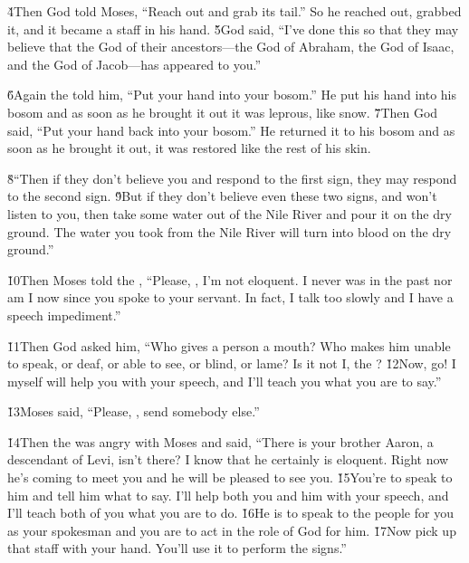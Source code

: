 \v{4}Then God told Moses, ``Reach out and grab its tail.'' So he reached out, grabbed it, and it became a staff in his hand. \v{5}God said, ``I've done this so that they may believe that the  God of their ancestors---the God of Abraham, the God of Isaac, and the God of Jacob---has appeared to you.''

\v{6}Again the  told him, ``Put your hand into your bosom.'' He put his hand into his bosom and as soon as he brought it out it was leprous, like snow. \v{7}Then God said, ``Put your hand back into your bosom.'' He returned it to his bosom and as soon as he brought it out, it was restored like the rest of his skin.

\v{8}``Then if they don't believe you and respond to the first sign, they may respond to the second sign. \v{9}But if they don't believe even these two signs, and won't listen to you, then take some water out of the Nile River and pour it on the dry ground. The water you took from the Nile River will turn into blood on the dry ground.''

\v{10}Then Moses told the , ``Please, , I'm not eloquent. I never was in the past nor am I now since you spoke to your servant. In fact, I talk too slowly and I have a speech impediment.''

\v{11}Then God asked him, ``Who gives a person a mouth? Who makes him unable to speak, or deaf, or able to see, or blind, or lame? Is it not I, the ? \v{12}Now, go! I myself will help you with your speech, and I'll teach you what you are to say.''

\v{13}Moses said, ``Please, , send somebody else.''

\v{14}Then the  was angry with Moses and said, ``There is your brother Aaron, a descendant of Levi, isn't there? I know that he certainly is eloquent. Right now he's coming to meet you and he will be pleased to see you. \v{15}You're to speak to him and tell him what to say. I'll help both you and him with your speech, and I'll teach both of you what you are to do. \v{16}He is to speak to the people for you as your spokesman and you are to act in the role of God for him. \v{17}Now pick up that staff with your hand. You'll use it to perform the signs.''

